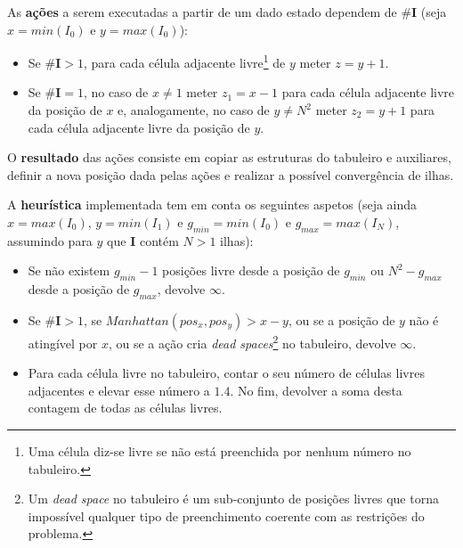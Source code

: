 \documentclass[12pt]{exam}
\renewcommand\_{\textunderscore\linebreak[1]}
\begin{document}
        \vspace{-3.5mm}
        \indent As \textbf{ações} a serem executadas a partir de um dado estado dependem de \#\textbf{I} (seja $x = min(I_{0})$ e $y = max(I_{0})$):\\
        \vspace{-6.5mm}
        \begin{itemize}[label=]
          \setlength\itemsep{-0.2em}
            \item Se $\#\textbf{I} > 1$, para cada célula adjacente livre\footnote{Uma célula diz-se livre se não está preenchida por nenhum número no tabuleiro.} de $y$ meter $z = y + 1$.
            \item Se $\#\textbf{I} = 1$, no caso de $x \neq 1$ meter $z_{1} = x - 1$ para cada célula adjacente livre da posição de $x$ e, analogamente, no caso de $y \neq N^2$ meter $z_{2} = y + 1$ para cada célula adjacente livre da posição de $y$.
        \end{itemize}
        \vspace{-3mm}

        \indent O \textbf{resultado} das ações consiste em copiar as estruturas do tabuleiro e auxiliares, definir a nova posição dada pelas ações e realizar a possível convergência de ilhas.

        \indent A \textbf{heurística} implementada tem em conta os seguintes aspetos (seja ainda $x = max(I_{0})$, $y = min(I_{1})$ e $g_{min} = min(I_{0})$ e $g_{max} = max(I_{N})$, assumindo para $y$ que \textbf{I} contém $N > 1$ ilhas):
        \vspace{-2mm}
        \begin{itemize}[label=]
          \setlength\itemsep{-0.2em}
            \item Se não existem $g_{min} - 1$ posições livre desde a posição de $g_{min}$ ou $N^2 - g_{max}$ desde a posição de $g_{max}$, devolve $\infty$.
            \item Se $\#\textbf{I} > 1$, se $Manhattan(pos_{x}, pos_{y}) > x - y$, ou se a posição de $y$ não é atingível por $x$, ou se a ação cria \textit{dead spaces}\footnote{Um \textit{dead space} no tabuleiro é um sub-conjunto de posições livres que torna impossível qualquer tipo de preenchimento coerente com as restrições do problema.} no tabuleiro, devolve $\infty$.
            \item Para cada célula livre no tabuleiro, contar o seu número de células livres adjacentes e elevar esse número a $1.4$. No fim, devolver a soma desta contagem de todas as células livres.
        \end{itemize}
\end{document}
